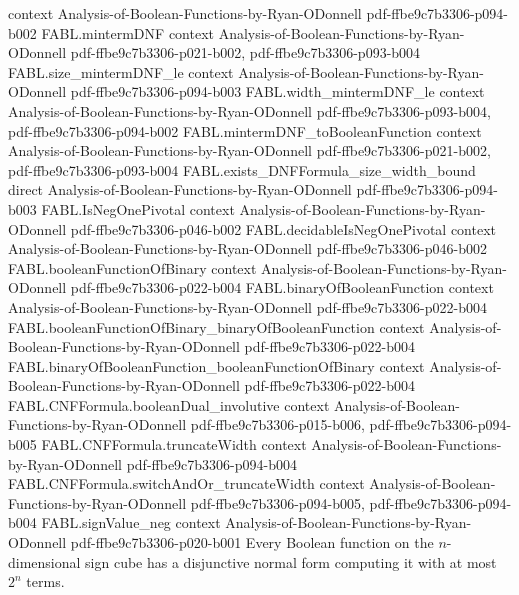 \begin{theorem}
  {context}
  {Analysis-of-Boolean-Functions-by-Ryan-ODonnell}
  {pdf-ffbe9c7b3306-p094-b002}
\proofstep
  {FABL.mintermDNF}
  {context}
  {Analysis-of-Boolean-Functions-by-Ryan-ODonnell}
  {pdf-ffbe9c7b3306-p021-b002,
    pdf-ffbe9c7b3306-p093-b004}
\proofstep
  {FABL.size_mintermDNF_le}
  {context}
  {Analysis-of-Boolean-Functions-by-Ryan-ODonnell}
  {pdf-ffbe9c7b3306-p094-b003}
\proofstep
  {FABL.width_mintermDNF_le}
  {context}
  {Analysis-of-Boolean-Functions-by-Ryan-ODonnell}
  {pdf-ffbe9c7b3306-p093-b004,
    pdf-ffbe9c7b3306-p094-b002}
\proofstep
  {FABL.mintermDNF_toBooleanFunction}
  {context}
  {Analysis-of-Boolean-Functions-by-Ryan-ODonnell}
  {pdf-ffbe9c7b3306-p021-b002,
    pdf-ffbe9c7b3306-p093-b004}
\proofstep
  {FABL.exists_DNFFormula_size_width_bound}
  {direct}
  {Analysis-of-Boolean-Functions-by-Ryan-ODonnell}
  {pdf-ffbe9c7b3306-p094-b003}
\proofstep
  {FABL.IsNegOnePivotal}
  {context}
  {Analysis-of-Boolean-Functions-by-Ryan-ODonnell}
  {pdf-ffbe9c7b3306-p046-b002}
\proofstep
  {FABL.decidableIsNegOnePivotal}
  {context}
  {Analysis-of-Boolean-Functions-by-Ryan-ODonnell}
  {pdf-ffbe9c7b3306-p046-b002}
\proofstep
  {FABL.booleanFunctionOfBinary}
  {context}
  {Analysis-of-Boolean-Functions-by-Ryan-ODonnell}
  {pdf-ffbe9c7b3306-p022-b004}
\proofstep
  {FABL.binaryOfBooleanFunction}
  {context}
  {Analysis-of-Boolean-Functions-by-Ryan-ODonnell}
  {pdf-ffbe9c7b3306-p022-b004}
\proofstep
  {FABL.booleanFunctionOfBinary_binaryOfBooleanFunction}
  {context}
  {Analysis-of-Boolean-Functions-by-Ryan-ODonnell}
  {pdf-ffbe9c7b3306-p022-b004}
\proofstep
  {FABL.binaryOfBooleanFunction_booleanFunctionOfBinary}
  {context}
  {Analysis-of-Boolean-Functions-by-Ryan-ODonnell}
  {pdf-ffbe9c7b3306-p022-b004}
\proofstep
  {FABL.CNFFormula.booleanDual_involutive}
  {context}
  {Analysis-of-Boolean-Functions-by-Ryan-ODonnell}
  {pdf-ffbe9c7b3306-p015-b006,
    pdf-ffbe9c7b3306-p094-b005}
\proofstep
  {FABL.CNFFormula.truncateWidth}
  {context}
  {Analysis-of-Boolean-Functions-by-Ryan-ODonnell}
  {pdf-ffbe9c7b3306-p094-b004}
\proofstep
  {FABL.CNFFormula.switchAndOr_truncateWidth}
  {context}
  {Analysis-of-Boolean-Functions-by-Ryan-ODonnell}
  {pdf-ffbe9c7b3306-p094-b005,
    pdf-ffbe9c7b3306-p094-b004}
\proofstep
  {FABL.signValue_neg}
  {context}
  {Analysis-of-Boolean-Functions-by-Ryan-ODonnell}
  {pdf-ffbe9c7b3306-p020-b001}
Every Boolean function on the $n$-dimensional sign cube has a disjunctive normal form
computing it with at most $2^n$ terms.
\end{theorem}

